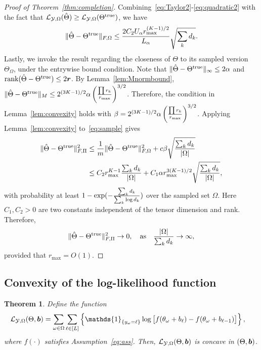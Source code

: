 \documentclass[11pt]{article}
\theoremstyle{plain}
\newtheorem{thm}{Theorem}[section]
\theoremstyle{definition}
\begin{document}
\begin{proof}[Proof of Theorem~\ref{thm:completion}]
Combining~\eqref{eq:Taylor2}-\eqref{eq:quadratic2} with the fact that $\mathcal{L}_{\mathcal{Y},\Omega}(\hat \Theta)\geq \mathcal{L}_{\mathcal{Y},\Omega}(\Theta^{\text{true}})$, we have
\begin{equation}\label{eq:sample}
\lVert\hat \Theta-\Theta^{\text{true}}\rVert_{F,\Omega}\leq {2C_2U_\alpha  r_{\max}^{(K-1)/2} \over L_\alpha} \sqrt{\sum_kd_k}.
\end{equation}
Lastly, we invoke the result regarding the closeness of $\Theta$ to its sampled version $\Theta_{\Omega}$, under the entrywise bound condition. Note that $\lVert\hat\Theta-\Theta^{\text{true}}\rVert_\infty\leq 2\alpha$ and $\text{rank}(\hat \Theta-\Theta^{\text{true}})\leq 2\bm{r}$. By Lemma~\ref{lem:Mnormbound}, $\lVert\hat \Theta-\Theta^{\text{true}}\rVert_M\leq 2^{(3K-1)/2} \alpha \left({\prod r_k \over r_{\max}}\right)^{3/2}$. Therefore, the condition in Lemma~\ref{lem:convexity} holds with $\beta=2^{(3K-1)/2}\alpha \left({\prod r_k \over r_{\max}}\right)^{3/2}$.
Applying Lemma~\ref{lem:convexity} to~\eqref{eq:sample} gives
\begin{align}
 \lVert\hat \Theta-\Theta^{\text{true}}\rVert_{F,\Pi}^2&\leq {1\over m}\lVert\hat \Theta-\Theta^{\text{true}}\rVert_{F,\Omega}^2+c\beta\sqrt{\sum_k d_k\over |\Omega|}\\
 &\leq {C_2  r^{K-1}_{\max}} {\sum_k d_k \over |\Omega|}+C_1 \alpha r_{\max}^{3(K-1)/2}\sqrt{\sum_kd_k\over |\Omega|},
\end{align}
with probability at least $1-\exp(-{\sum_kd_k\over \sum_k \log d_k})$ over the sampled set $\Omega$. Here $C_1, C_2>0$ are two constants independent of the tensor dimension and rank. Therefore,
\[
 \lVert\hat \Theta-\Theta^{\text{true}}\rVert_{F,\Pi}^2\to 0,\quad \text{as}\quad {|\Omega|\over \sum_kd_k}\to \infty,
\]
provided that $r_{\max}=O(1)$.
\end{proof}

\subsection{Convexity of the log-likelihood function}
\begin{thm}\label{thm:convexity}
Define the function
\begin{align}\label{eq:function}
 \logl(\Theta, \mb)&=\sum_{\omega\in\Omega}\sum_{\ell\in[L]} \left\{\mathds{1}_{\{y_\omega=\ell\}} \log \big[f(\theta_\omega+b_\ell)-  f(\theta_\omega+b_{\ell-1})\big]\right\},
 \end{align}
where $f(\cdot)$ satisfies Assumption~\eqref{eq:ass}. Then, $\mathcal{L}_{\mathcal{Y},\Omega}(\Theta, \bm{b})$ is concave in $(\Theta,\bm{b})$. 
\end{thm}
\end{document}
